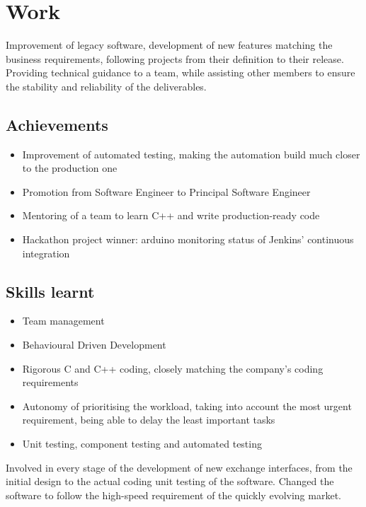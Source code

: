 \documentclass{cv}
\begin{document}
\iffalse\contact{address line 1}
        {address line 2}
        {address line 3}
        {email@address.com}
        {+phone~number}
\fi

\section{Work}
{Improvement of legacy software, development of new features matching the business requirements, following projects from their definition to their release. Providing technical guidance to a team, while assisting other members to ensure the stability and reliability of the deliverables.}
\subsection{Achievements}
\begin{itemize}
    \item {Improvement of automated testing, making the automation build much closer to the production one}
    \item {Promotion from Software Engineer to Principal Software Engineer}
    \item {Mentoring of a team to learn C++ and write production-ready code}
    \item {Hackathon project winner: arduino monitoring status of Jenkins' continuous integration}
\end{itemize}
\subsection{Skills learnt}
\begin{itemize}
    \item {Team management}
    \item {Behavioural Driven Development}
    \item {Rigorous C and C++ coding, closely matching the company's coding requirements}
    \item {Autonomy of prioritising the workload, taking into account the most urgent requirement, being able to delay the least important tasks}
    \item {Unit testing, component testing and automated testing}
\end{itemize}

{Involved in every stage of the development of new exchange interfaces, from the initial design to the actual coding unit testing of the software.
Changed the software to follow the high-speed requirement of the quickly evolving market.}
\end{document}

